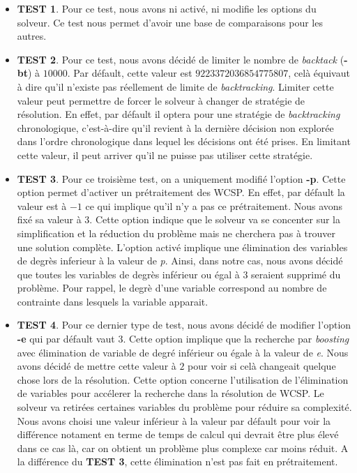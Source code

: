 \documentclass[a4paper, 10pt]{article}
\begin{document}
      \begin{itemize}
        \item \textbf{TEST 1}. Pour ce test, nous avons ni activé, ni modifie les options du solveur. Ce test nous permet d'avoir une base de comparaisons pour les autres.
        \item \textbf{TEST 2}. Pour ce test, nous avons décidé de limiter le nombre de \textit{backtack} (\textbf{-bt}) à $10000$. Par défault, cette valeur est $9223372036854775807$, celà équivaut à dire qu'il n'existe pas réellement de limite de \textit{backtracking}. Limiter cette valeur peut permettre de forcer le solveur à changer de stratégie de résolution. En effet, par défault il optera pour une stratégie de \textit{backtracking} chronologique, c'est-à-dire qu'il revient à la dernière décision non explorée dans l'ordre chronologique dans lequel les décisions ont été prises. En limitant cette valeur, il peut arriver qu'il ne puisse pas utiliser cette stratégie.
        \item \textbf{TEST 3}. Pour ce troisième test, on a uniquement modifié l'option \textbf{-p}. Cette option permet d'activer un prétraitement des WCSP. En effet, par défault la valeur est à $-1$ ce qui implique qu'il n'y a pas ce prétraitement. Nous avons fixé sa valeur à $3$. Cette option indique que le solveur va se concenter sur la simplification et la réduction du problème mais ne cherchera pas à trouver une solution complète. L'option activé implique une élimination des variables de degrès inferieur à la valeur de \textit{p}. Ainsi, dans notre cas, nous avons décidé que toutes les variables de degrès inférieur ou égal à $3$ seraient supprimé du problème. Pour rappel, le degrè d'une variable correspond au nombre de contrainte dans lesquels la variable apparait.
        \item \textbf{TEST 4}. Pour ce dernier type de test, nous avons décidé de modifier l'option \textbf{-e} qui par défault vaut $3$. Cette option implique que la recherche par \textit{boosting} avec élimination de variable de degré inférieur ou égale à la valeur de \textit{e}. Nous avons décidé de mettre cette valeur à $2$ pour voir si celà changeait quelque chose lors de la résolution. Cette option concerne l'utilisation de l'élimination de variables pour accélerer la recherche dans la résolution de WCSP. Le solveur va retirées certaines variables du problème pour réduire sa complexité. Nous avons choisi une valeur inférieur à la valeur par défault pour voir la différence notament en terme de temps de calcul qui devrait être plus élevé dans ce cas là, car on obtient un problème plus complexe car moins réduit. A la différence du \textbf{TEST 3}, cette élimination n'est pas fait en prétraitement.
      \end{itemize}
\end{document}
